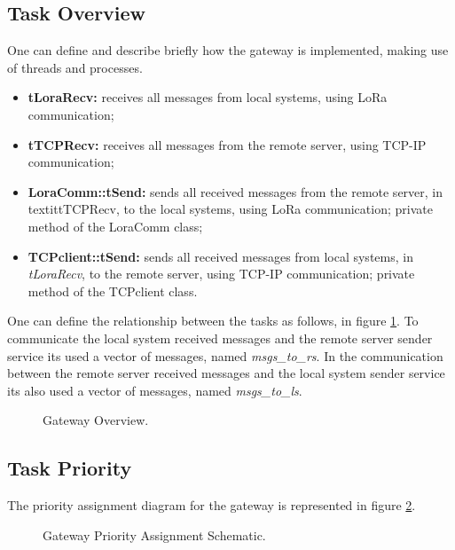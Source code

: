\subsection{Task Overview}
One can define and describe briefly how the gateway is implemented, making use of threads and processes.

\begin{itemize}
	\item \textbf{tLoraRecv: } receives all messages from local systems, using LoRa communication;
	\item \textbf{tTCPRecv: } receives all messages from the remote server, using TCP-IP communication;	
	\item \textbf{LoraComm::tSend: } sends all received messages from the remote server, in textit{tTCPRecv}, to the local systems, using LoRa communication; private method of the LoraComm class;
	\item \textbf{TCPclient::tSend: } sends all received messages from local systems, in \textit{tLoraRecv}, to the remote server, using TCP-IP communication; private method of the TCPclient class.
\end{itemize}

One can define the relationship between the tasks as follows, in figure \ref{fig:GwOverview}. To communicate the local system received messages and the remote server sender service its used a vector of messages, named \textit{msgs\_to\_rs}. In the communication between the remote server received messages and the local system sender service its also used a vector of messages, named \textit{msgs\_to\_ls}.

\begin{figure}[H]
	\centering
	\caption{Gateway Overview.}
	\label{fig:GwOverview}
\end{figure}

\clearpage
\subsection{Task Priority}
The priority assignment diagram for the gateway is represented in figure \ref{fig:gwt_priority}.

\begin{figure}[H]
	\centering
	\caption{Gateway Priority Assignment Schematic.}
	\label{fig:gwt_priority}
\end{figure}

